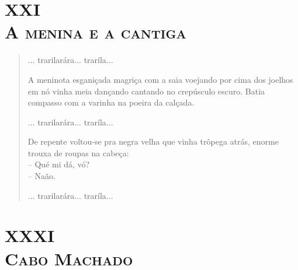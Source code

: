 \chapter[XXI -- \textsc{A menina e a cantiga}]{XXI\\\textsc{A menina e a cantiga}}


\begin{verse}
... trarilarára... traríla...

A meninota esganiçada magriça com a saia voejando por cima dos joelhos
em nó vinha meia dançando cantando no crepúsculo escuro. Batia compasso
com a varinha na poeira da calçada.

... trarilarára... traríla...

De repente voltou-se pra negra velha que vinha trôpega atrás, enorme
trouxa de roupas na cabeça:\\
-- Qué mi dá, vó?\\
-- Naão.

... trarilarára... traríla...
\end{verse}

\chapter[XXXI -- \textsc{Cabo Machado}]{XXXI\\\textsc{Cabo Machado}}

